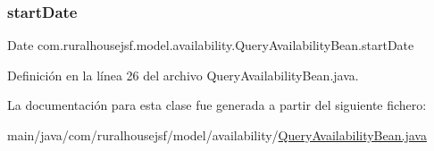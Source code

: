 \subsubsection{\texorpdfstring{startDate}{startDate}}
{\footnotesize\ttfamily Date com.\+ruralhousejsf.\+model.\+availability.\+Query\+Availability\+Bean.\+start\+Date\hspace{0.3cm}{\ttfamily [private]}}



Definición en la línea 26 del archivo Query\+Availability\+Bean.\+java.



La documentación para esta clase fue generada a partir del siguiente fichero\+:\begin{DoxyCompactItemize}
\item 
main/java/com/ruralhousejsf/model/availability/\mbox{\hyperlink{a00074}{Query\+Availability\+Bean.\+java}}\end{DoxyCompactItemize}
